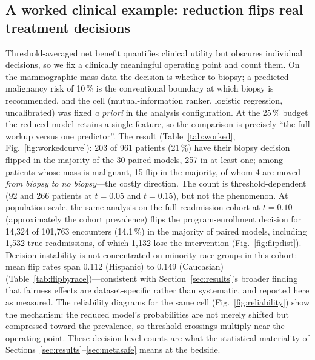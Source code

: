 \documentclass[fleqn,10pt]{wlscirep}
\newcommand{\result}[1]{#1}
\begin{document}
\subsection{A worked clinical example: reduction flips real treatment decisions}
\label{sec:worked}
Threshold-averaged net benefit quantifies clinical utility but obscures individual decisions, so we
fix a clinically meaningful operating point and count them. On the mammographic-mass data the decision
is whether to biopsy; a predicted malignancy risk of \result{10\,\%} is the conventional boundary at
which biopsy is recommended, and the cell (mutual-information ranker, logistic regression,
uncalibrated) was fixed \emph{a priori} in the analysis configuration. At the 25\,\% budget the
reduced model retains a single feature, so the comparison is precisely ``the full workup versus one
predictor''. The result (Table~\ref{tab:worked}, Fig.~\ref{fig:workedcurve}): \result{203} of
\result{961} patients (\result{21\,\%}) have their biopsy decision flipped in the majority of the 30
paired models, \result{257} in at least one; among patients whose mass is malignant, \result{15} flip
in the majority, of whom \result{4} are moved \emph{from biopsy to no biopsy}---the costly direction.
The count is threshold-dependent (\result{92} and \result{266} patients at $t=\result{0.05}$ and
$t=\result{0.15}$), but not the phenomenon. At population scale, the same analysis on the full
readmission cohort at $t=\result{0.10}$ (approximately the cohort prevalence) flips the
program-enrollment decision for \result{14{,}324} of \result{101{,}763} encounters
(\result{14.1\,\%}) in the majority of paired models, including \result{1{,}532} true readmissions,
of which \result{1{,}132} lose the intervention (Fig.~\ref{fig:flipdist}). Decision instability is
not concentrated on minority race groups in this cohort: mean flip rates span \result{0.112}
(Hispanic) to \result{0.149} (Caucasian) (Table~\ref{tab:flipbyrace})---consistent with
Section~\ref{sec:results}'s broader finding that fairness effects are dataset-specific rather than
systematic, and reported here as measured. The reliability diagrams for the same cell
(Fig.~\ref{fig:reliability}) show the mechanism: the reduced model's probabilities are not merely
shifted but compressed toward the prevalence, so threshold crossings multiply near the operating
point. These decision-level counts are what the statistical materiality of
Sections~\ref{sec:results}--\ref{sec:metasafe} means at the bedside.

\begin{table}[t]
\centering
\caption{Exemplar patients from the worked example (mammographic mass; mutual-information ranker,
logistic regression; biopsy threshold $t=0.10$). $\bar p$ is the mean out-of-fold predicted
malignancy risk over the 30 paired repetitions under the full model and the one-feature reduced
model; the flip rate is the fraction of repetitions in which the two models disagree at $t$. Patients
with malignant masses pushed below the biopsy threshold are listed first. Computed from the released
per-patient prediction caches.}
\label{tab:worked}

\end{table}
\end{document}
